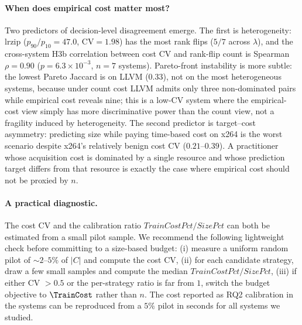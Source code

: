 \paragraph*{When does empirical cost matter most?}
Two predictors of decision-level disagreement emerge. The first is
heterogeneity: lrzip ($p_{90}/p_{10}\!=\!47.0$, $\mathrm{CV}\!=\!1.98$)
has the most rank flips ($5/7$ across $\lambda$), and the cross-system
H3b correlation between cost CV and rank-flip count is Spearman
$\rho\!=\!0.90$ ($p\!=\!6.3\!\times\!10^{-3}$, $n\!=\!7$ \StudyReplication
systems). Pareto-front instability is more subtle: the lowest Pareto
Jaccard is on LLVM ($0.33$), not on the most heterogeneous systems,
because under count cost LLVM admits only three non-dominated pairs
while empirical cost reveals nine; this is a low-CV system where the
empirical-cost view simply has more discriminative power than the
count view, not a fragility induced by heterogeneity. The second
predictor is target--cost asymmetry: predicting size while paying
time-based cost on x264 is the worst scenario despite x264's
relatively benign cost CV ($0.21$--$0.39$). A practitioner whose
acquisition cost is dominated by a single resource and whose
prediction target differs from that resource is exactly the case
where empirical cost should not be proxied by $n$.

\paragraph*{A practical diagnostic.}
The cost CV and the calibration ratio
$\mathit{TrainCostPct}/\mathit{SizePct}$ can both be estimated from a
small pilot sample. We recommend the following lightweight check before
committing to a size-based budget: (i) measure a uniform random pilot
of $\sim\!\!2$--$5\%$ of $|C|$ and compute the cost CV, (ii) for each
candidate strategy, draw a few small samples and compute the median
$\mathit{TrainCostPct}/\mathit{SizePct}$, (iii) if either CV $>0.5$ or
the per-strategy ratio is far from $1$, switch the budget objective to
$\TrainCost$ rather than $n$. The cost reported as RQ2 calibration in
the \StudyReplication systems can be reproduced from a $5\%$ pilot in seconds for
all systems we studied.

